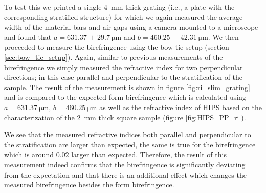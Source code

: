 To test this we printed a single \SI{4}{\milli \meter} thick grating (i.e., a plate with the corresponding stratified structure) for which we again measured the average width of the material bars and air gaps using a camera mounted to a microscope and found that $a=\SI[separate-uncertainty = true]{631.37(2970)}{\micro \meter}$ and $b=\SI[separate-uncertainty = true]{460.25(4231)}{\micro \meter}$. We then proceeded to measure the birefringence using the bow-tie setup (section \ref{sec:bow_tie_setup}). Again, similar to previous measurements of the birefringence we simply measured the refractive index for two perpendicular directions; in this case parallel and perpendicular to the stratification of the sample. The result of the measurement is shown in figure \ref{fig:ri_slim_grating} and is compared to the expected form birefringence which is calculated using $a=\SI{631.37}{\micro \meter}$, $b=\SI{460.25}{\micro \meter}$ as well as the refractive index of HIPS based on the characterization of the \SI{2}{\milli \meter} thick square sample (figure \ref{fig:HIPS_PP_ri}). 

We see that the measured refractive indices both parallel and perpendicular to the stratification are larger than expected, the same is true for the birefringence which is around $0.02$ larger than expected. Therefore, the result of this measurement indeed confirms that the birefringence is significantly deviating from the expectation and that there is an additional effect which changes the measured birefringence besides the form birefringence. 


